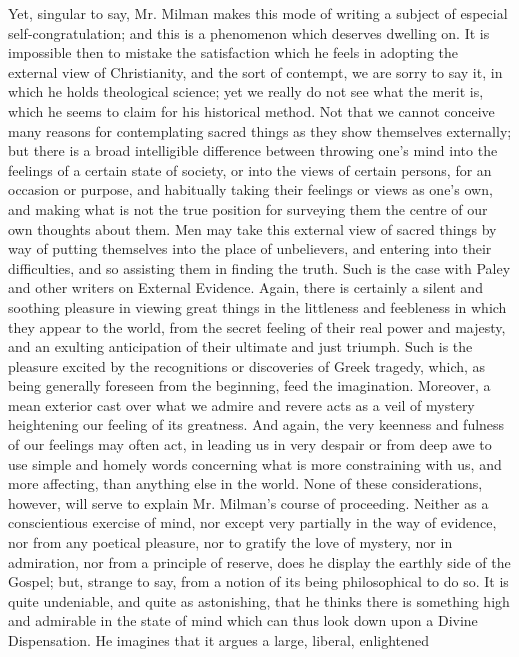Yet, singular to say, Mr. Milman makes this mode
of writing a subject of especial self-congratulation; and this is a
phenomenon which deserves dwelling on. It is impossible then to
mistake the satisfaction which he feels in adopting the external view
of Christianity, and the sort of contempt, we are sorry to say it, in
which he holds theological science; yet we really do not see what the
merit is, which he seems to claim for his historical method. Not that
we cannot conceive many reasons for contemplating sacred things as
they show themselves externally; but there is a broad intelligible
difference between throwing one's mind into the feelings of a certain
state of society, or into the views of certain persons, for an
occasion or purpose, and habitually taking their feelings or views as
one's own, and making what is not the true position for surveying them
the centre of our own thoughts about them. Men may take this external
view of sacred things by way of putting themselves into the place of
unbelievers, and entering into their difficulties, and so assisting
them in finding the truth. Such is the case with Paley and other
writers on External Evidence. Again, there is certainly a silent and
soothing pleasure in viewing great things in the littleness and
feebleness in which they appear to the world, from the secret feeling
of their real power and majesty, and an exulting anticipation of their
ultimate and just triumph. Such is the pleasure excited by the
recognitions or discoveries of Greek tragedy, which, as being
generally foreseen from the beginning, feed the imagination. Moreover,
a mean exterior cast over what we admire and revere acts as a veil of
mystery heightening our feeling of its greatness. And again, the very
keenness and fulness of our feelings may often act, in leading us in
very despair or from deep awe to use simple and homely words
concerning what is more constraining with us, and more affecting, than
anything else in the world. None of these considerations, however,
will serve to explain Mr. Milman's course of proceeding. Neither as a
conscientious exercise of mind, nor except very partially in the way
of evidence, nor from any poetical pleasure, nor to gratify the love
of mystery, nor in admiration, nor from a principle of reserve, does
he display the earthly side of the Gospel; but, strange to say, from a
notion of its being philosophical to do so. It is quite undeniable,
and quite as astonishing, that he thinks there is something high and
admirable in the state of mind which can thus look down upon a Divine
Dispensation. He imagines that it argues a large, liberal, enlightened
